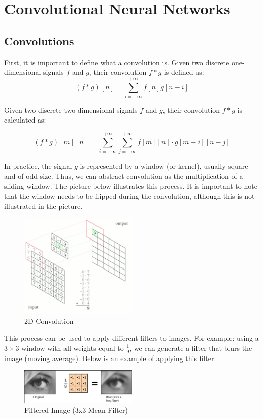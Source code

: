 \section{Convolutional Neural Networks}
\label{sec:convolutions}
\subsection{Convolutions}
First, it is important to define what a convolution is. Given two discrete one-dimensional signals \(f\) and \(g\), their convolution \(f * g\) is defined as:
\[
(f*g)[n] = \sum_{i=-\infty}^{+\infty} f[n] g[n-i]
\]

Given two discrete two-dimensional signals \(f\) and \(g\), their convolution \(f * g\) is calculated as:

\[
(f*g)[m][n] = \sum_{i=-\infty}^{+\infty} \sum_{j=-\infty}^{+\infty} f[m][n] \cdot g[m-i][n-j]
\]

In practice, the signal \(g\) is represented by a window (or kernel), usually square and of odd size. Thus, we can abstract convolution as the multiplication of a sliding window. The picture below illustrates this process. It is important to note that the window needs to be flipped during the convolution, although this is not illustrated in the picture.

\begin{figure}[h!]
    \centering
    \includegraphics[width=0.5\textwidth]{figuras/conv.png}
    \caption{2D Convolution}
\end{figure}

This process can be used to apply different filters to images. For example: using a \(3 \times 3\) window with all weights equal to \(\frac{1}{9}\), we can generate a filter that blurs the image (moving average). Below is an example of applying this filter:

\begin{figure}[h!]
    \centering
    \includegraphics[width=0.5\textwidth]{figuras/blur.png}
    \caption{Filtered Image (3x3 Mean Filter)}
\end{figure}

